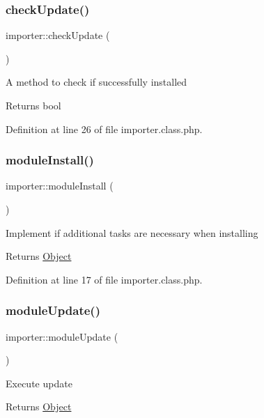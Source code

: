 \subsubsection{\texorpdfstring{check\+Update()}{checkUpdate()}}
{\footnotesize\ttfamily importer\+::check\+Update (\begin{DoxyParamCaption}{ }\end{DoxyParamCaption})}

A method to check if successfully installed \begin{DoxyReturn}{Returns}
bool 
\end{DoxyReturn}


Definition at line 26 of file importer.\+class.\+php.

\hypertarget{classimporter_a33af57565401adc2b415a3403e7f86f0}{}\label{classimporter_a33af57565401adc2b415a3403e7f86f0} 
\subsubsection{\texorpdfstring{module\+Install()}{moduleInstall()}}
{\footnotesize\ttfamily importer\+::module\+Install (\begin{DoxyParamCaption}{ }\end{DoxyParamCaption})}

Implement if additional tasks are necessary when installing \begin{DoxyReturn}{Returns}
\hyperlink{classObject}{Object} 
\end{DoxyReturn}


Definition at line 17 of file importer.\+class.\+php.

\hypertarget{classimporter_affadc5d8acbfc67adbd423350b1ccb96}{}\label{classimporter_affadc5d8acbfc67adbd423350b1ccb96} 
\subsubsection{\texorpdfstring{module\+Update()}{moduleUpdate()}}
{\footnotesize\ttfamily importer\+::module\+Update (\begin{DoxyParamCaption}{ }\end{DoxyParamCaption})}

Execute update \begin{DoxyReturn}{Returns}
\hyperlink{classObject}{Object} 
\end{DoxyReturn}


